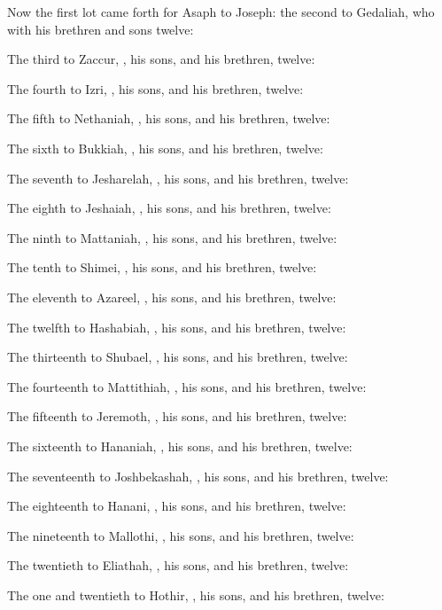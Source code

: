 {Now the
first
lot came
forth for
Asaph to
Joseph: the
second to
Gedaliah, who with his
brethren and
sons
{}
twelve:

The
third to
Zaccur,
{}, his
sons, and his
brethren,
{}
twelve:

The
fourth to
Izri,
{}, his
sons, and his
brethren,
{}
twelve:

The
fifth to
Nethaniah,
{}, his
sons, and his
brethren,
{}
twelve:

The
sixth to
Bukkiah,
{}, his
sons, and his
brethren,
{}
twelve:

The
seventh to
Jesharelah,
{}, his
sons, and his
brethren,
{}
twelve:

The
eighth to
Jeshaiah,
{}, his
sons, and his
brethren,
{}
twelve:

The
ninth to
Mattaniah,
{}, his
sons, and his
brethren,
{}
twelve:

The
tenth to
Shimei,
{}, his
sons, and his
brethren,
{}
twelve:

The
eleventh to
Azareel,
{}, his
sons, and his
brethren,
{}
twelve:

The
twelfth to
Hashabiah,
{}, his
sons, and his
brethren,
{}
twelve:

The
thirteenth to
Shubael,
{}, his
sons, and his
brethren,
{}
twelve:

The
fourteenth to
Mattithiah,
{}, his
sons, and his
brethren,
{}
twelve:

The
fifteenth to
Jeremoth,
{}, his
sons, and his
brethren,
{}
twelve:

The
sixteenth to
Hananiah,
{}, his
sons, and his
brethren,
{}
twelve:

The
seventeenth to
Joshbekashah,
{}, his
sons, and his
brethren,
{}
twelve:

The
eighteenth to
Hanani,
{}, his
sons, and his
brethren,
{}
twelve:

The
nineteenth to
Mallothi,
{}, his
sons, and his
brethren,
{}
twelve:

The
twentieth to
Eliathah,
{}, his
sons, and his
brethren,
{}
twelve:

The
one and
twentieth to
Hothir,
{}, his
sons, and his
brethren,
{}
twelve:

}
